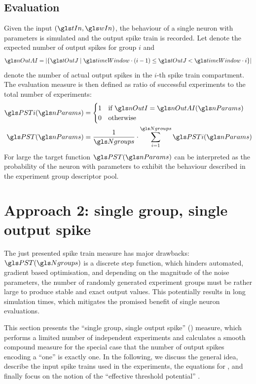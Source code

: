 \subsection{Evaluation}

Given the input $(\tIn, \wIn)$, the behaviour of a single neuron with parameters \nParams is simulated and the output spike train \tOut is recorded. Let \nOutI denote the expected number of output spikes for group $i$ and
\begin{align}
	\nOutAI = |\{ \tOutJ \mid \timeWindow \cdot (i - 1) \leq \tOutJ < \timeWindow \cdot i \}|
\end{align}
denote the number of actual output spikes in the $i$-th spike train compartment. The evaluation measure \PST is then defined as ratio of successful experiments to the total number of experiments:
\begin{align}
	\PSTi(\nParams) &= \begin{cases}
	          1 & \text{if } \nOutI = \nOutAI(\nParams) \\
	          0 & \text{otherwise} \\
	         \end{cases} \\
	\PST(\nParams) &= \frac{1}{\Ngroups} \cdot \sum_{i = 1}^{\Ngroups} \PSTi(\nParams)
	\label{eqn:spike_train_measure}
\end{align}
For large \Ngroups the target function $\PST(\nParams)$ can be interpreted as the probability of the neuron with parameters \nParams to exhibit the behaviour described in the experiment group descriptor pool.

\section{Approach 2: single group, single output spike}
\label{sec:sgso_measure}

The just presented spike train measure \PST has major drawbacks: $\PST(\Ngroups)$ is a discrete step function, which hinders automated, gradient based optimisation, and depending on the magnitude of the noise parameters, the number of randomly generated experiment groups \Ngroups must be rather large to produce stable and exact output values. This potentially results in long simulation times, which mitigates the promised benefit of single neuron evaluations.

This section presents the \enquote{single group, single output spike} (\SGSO) measure, which performs a limited number of independent experiments and calculates a smooth compound measure \PSGSO for the special case that the number of output spikes encoding a \enquote{one} is exactly one. In the following, we discuss the general idea, describe the input spike trains used in the experiments, the equations for \PSGSO, and finally focus on the notion of the \enquote{effective threshold potential} \EThEff.


